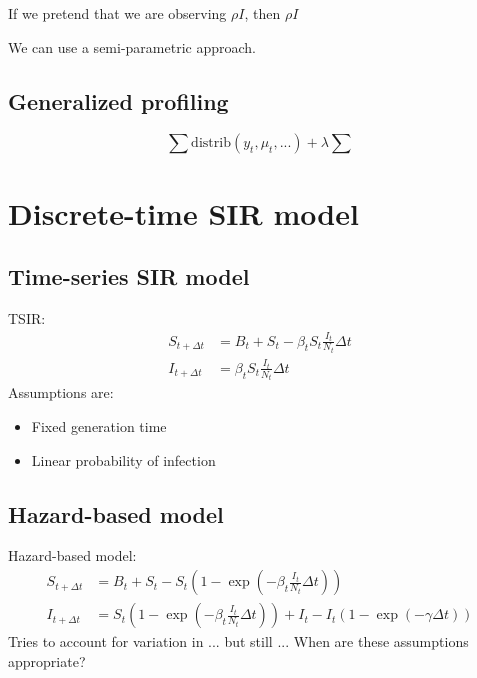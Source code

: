 \documentclass{article}
\begin{document}
If we pretend that we are observing $\rho I$, then $\rho I$



We can use a semi-parametric approach.


\subsection{Generalized profiling}

\begin{equation}
\sum \mathrm{distrib}(y_t, \mu_t, ...) + \lambda \sum 
\end{equation}






\section{Discrete-time SIR model}

\subsection{Time-series SIR model}

TSIR:
\begin{equation}
\begin{aligned}
S_{t + \Delta t} &= B_t + S_t - \beta_t S_t \frac{I_t}{N_t} \Delta t\\
I_{t + \Delta t} &= \beta_t S_t \frac{I_t}{N_t} \Delta t
\end{aligned}
\end{equation}
Assumptions are:
\begin{itemize}
	\item Fixed generation time
	\item Linear probability of infection
\end{itemize}

\subsection{Hazard-based model}

Hazard-based model:
\begin{equation}
\begin{aligned}
S_{t + \Delta t} &= B_t + S_t - S_t \left(1- \exp\left(-\beta_t \frac{I_t}{N_t} \Delta t\right)\right)\\
I_{t + \Delta t} &= S_t \left( 1- \exp\left(-\beta_t \frac{I_t}{N_t} \Delta t\right)\right) + I_t - I_t (1 - \exp(-\gamma \Delta t))
\end{aligned}
\end{equation}
Tries to account for variation in ... but still ... When are these assumptions appropriate?
\end{document}
